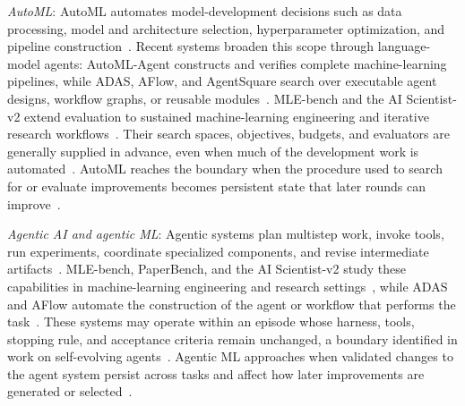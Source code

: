 \emph{AutoML}: AutoML automates model-development decisions such as data processing, model and architecture selection, hyperparameter optimization, and pipeline construction~\cite{trirat2025automlagent,ye2026ai4ai}. Recent systems broaden this scope through language-model agents: AutoML-Agent constructs and verifies complete machine-learning pipelines, while ADAS, AFlow, and AgentSquare search over executable agent designs, workflow graphs, or reusable modules~\cite{trirat2025automlagent,hu2025adas,zhang2025aflow,shang2025agentsquare}. MLE-bench and the AI Scientist-v2 extend evaluation to sustained machine-learning engineering and iterative research workflows~\cite{chan2025mlebench,yamada2025aiscientistv2}. Their search spaces, objectives, budgets, and evaluators are generally supplied in advance, even when much of the development work is automated~\cite{trirat2025automlagent,hu2025adas,zhang2025aflow}. AutoML reaches the \RSI{} boundary when the procedure used to search for or evaluate improvements becomes persistent state that later rounds can improve~\cite{hu2025adas,zhang2025aflow,fang2025selfevolving}.

\emph{Agentic AI and agentic ML}: Agentic systems plan multistep work, invoke tools, run experiments, coordinate specialized components, and revise intermediate artifacts~\cite{chan2025mlebench,starace2025paperbench,yamada2025aiscientistv2}. MLE-bench, PaperBench, and the AI Scientist-v2 study these capabilities in machine-learning engineering and research settings~\cite{chan2025mlebench,starace2025paperbench,yamada2025aiscientistv2}, while ADAS and AFlow automate the construction of the agent or workflow that performs the task~\cite{hu2025adas,zhang2025aflow}. These systems may operate within an episode whose harness, tools, stopping rule, and acceptance criteria remain unchanged, a boundary identified in work on self-evolving agents~\cite{fang2025selfevolving,zheng2026lifelong}. Agentic ML approaches \RSI{} when validated changes to the agent system persist across tasks and affect how later improvements are generated or selected~\cite{fang2025selfevolving,hu2025adas,zhang2025aflow}.

